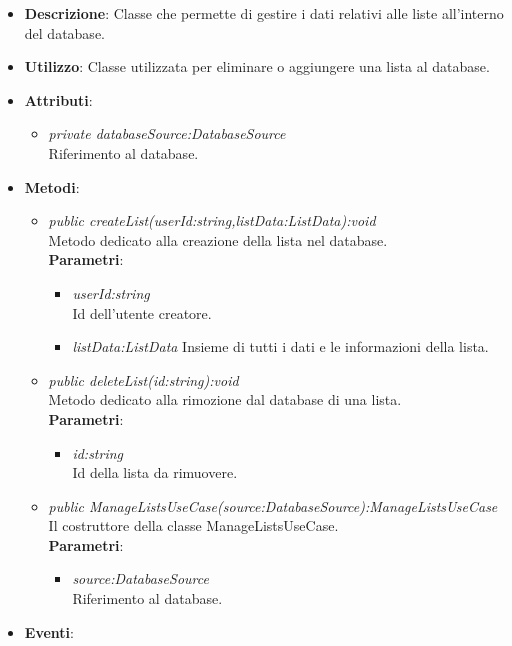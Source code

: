 \begin{itemize}
\item \textbf{Descrizione}: Classe che permette di gestire i dati relativi alle liste all'interno del database.
\item \textbf{Utilizzo}: Classe utilizzata per eliminare o aggiungere una lista al database.
\item \textbf{Attributi}: 
	\begin{itemize}
	\item \textit{private databaseSource:DatabaseSource}\\
		Riferimento al database.
	\end{itemize}
\item \textbf{Metodi}:
	\begin{itemize}
	\item \textit{public createList(userId:string,listData:ListData):void}\\
		Metodo dedicato alla creazione della lista nel database.
			\\ \textbf{Parametri}: \begin{itemize}
			\item \textit{userId:string}\\
			Id dell'utente creatore.
			\item \textit{listData:ListData}
			Insieme di tutti i dati e le informazioni della lista.
			\end{itemize} 
	\item \textit{public deleteList(id:string):void}\\
	Metodo dedicato alla rimozione dal database di una lista.
			\\ \textbf{Parametri}: \begin{itemize}
			\item \textit{id:string}\\
			Id della lista da rimuovere.
			\end{itemize} 
	\item \textit{public ManageListsUseCase(source:DatabaseSource):ManageListsUseCase}\\
	Il costruttore della classe ManageListsUseCase.
		\\ \textbf{Parametri}: \begin{itemize}
			\item \textit{source:DatabaseSource}\\
						Riferimento al database.
			\end{itemize} 
	\end{itemize}
\item \textbf{Eventi}:
\end{itemize}

